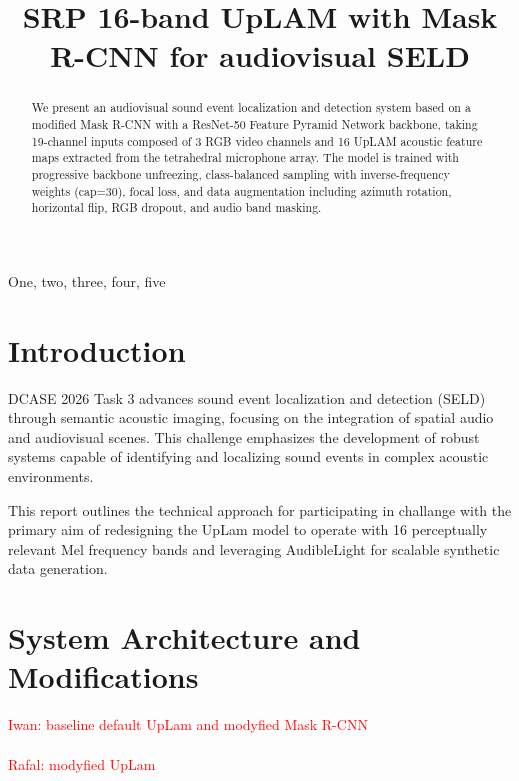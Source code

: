 \documentclass{article}
\title{SRP 16-band UpLAM with Mask R-CNN for audiovisual SELD}
\begin{document}
\ninept
\maketitle

\begin{sloppy}

\begin{abstract}
We present an audiovisual sound event localization and detection system based on a modified Mask R-CNN with a ResNet-50 Feature Pyramid Network backbone, taking 19-channel inputs composed of 3 RGB video channels and 16 UpLAM acoustic feature maps extracted from the tetrahedral microphone array. The model is trained with progressive backbone unfreezing, class-balanced sampling with inverse-frequency weights (cap=30), focal loss, and data augmentation including azimuth rotation, horizontal flip, RGB dropout, and audio band masking.
\end{abstract}

\begin{keywords}
One, two, three, four, five
\end{keywords}


\section{Introduction}
\label{sec:intro}

DCASE 2026 Task 3 advances sound event localization and detection (SELD) through semantic acoustic imaging, focusing on the integration of spatial audio and audiovisual scenes. This challenge emphasizes the development of robust systems capable of identifying and localizing sound events in complex acoustic environments.

This report outlines the technical approach for participating in challange with the primary aim of redesigning the UpLam model to operate with 16 perceptually relevant Mel frequency bands and leveraging AudibleLight for scalable synthetic data generation.





\section{System Architecture and Modifications}
\label{sec:format}
\textcolor{red}{Iwan: baseline default UpLam and modyfied Mask R-CNN}\\
\\
\textcolor{red}{Rafal: modyfied UpLam}




\end{sloppy}
\end{document}
